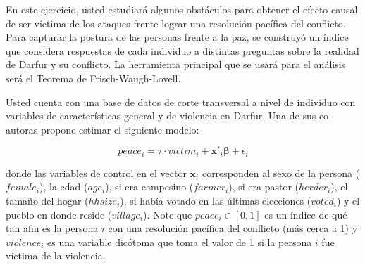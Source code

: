 \documentclass[a4paper, answers, addpoints, 11pt]{exam}
\begin{document}
\bigskip En este ejercicio, usted estudiará algunos obstáculos para obtener el efecto causal de ser víctima de los ataques frente lograr una resolución pacífica del conflicto. Para capturar la postura de las personas frente a la paz, se construyó un índice que considera respuestas de cada individuo a distintas preguntas sobre la realidad de Darfur y su conflicto. La herramienta principal que se usará para el análisis será el Teorema de Frisch-Waugh-Lovell.

Usted cuenta con una base de datos de corte transversal a nivel de individuo con variables de características general y de violencia en Darfur. Una de sus co-autoras propone estimar el siguiente modelo:

\begin{equation}\label{eq:no_z}
    peace_i = \tau \cdot victim_i + \textbf{x}'_i\boldsymbol\beta + \epsilon_i
\end{equation}

    donde las variables de control en el vector $\textbf{x}_i$ corresponden al sexo de la persona ($female_i$), la edad ($age_i$), si era campesino ($farmer_i$), si era pastor ($herder_i$), el tamaño del hogar ($hhsize_i$), si había votado en las últimas elecciones ($voted_i$) y el pueblo en donde reside ($village_i$). Note que $peace_i \in [0,1]$ es un índice de qué tan afin es la persona $i$ con una resolución pacífica del conflicto (más cerca a 1) y $violence_i$ es una variable dicótoma que toma el valor de 1 si la persona $i$ fue víctima de la violencia.
\end{document}
